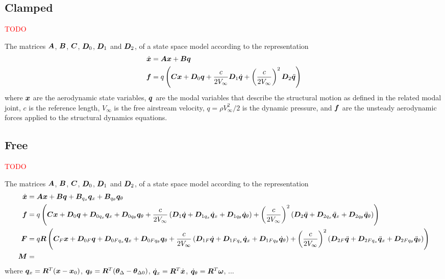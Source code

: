\subsection{Clamped}
\textcolor{red}{TODO}

The matrices $\bm{A}$, $\bm{B}$, $\bm{C}$, $\bm{D}_0$, $\bm{D}_1$ and $\bm{D}_2$,
of a state space model according to the representation
\begin{align*}
	\dot{\bm{x}}
	&=
	\bm{A}\bm{x} + \bm{B}\bm{q}
	\\
	\bm{f}
	&=
	q\left( \bm{C}\bm{x} + \bm{D}_0 \bm{q} + \frac{c}{2V_{\infty}} \bm{D}_1 \dot{\bm{q}} + \left( \frac{c}{2V_{\infty}} \right)^2 \bm{D}_2 \ddot{\bm{q}} \right)
\end{align*}
where $\bm{x}$ are the aerodynamic state variables,
$\bm{q}$ are the modal variables that describe the structural motion
as defined in the related modal joint,
$c$ is the reference length, $V_\infty$ is the free airstream velocity,
$q = \rho V_{\infty}^2/2$ is the dynamic pressure,
and $\bm{f}$ are the unsteady aerodynamic forces applied to the structural
dynamics equations.



\subsection{Free}
\textcolor{red}{TODO}

The matrices $\bm{A}$, $\bm{B}$, $\bm{C}$, $\bm{D}_0$, $\bm{D}_1$ and $\bm{D}_2$,
of a state space model according to the representation
\begin{align*}
	\dot{\bm{x}}
	&=
	\bm{A}\bm{x} + \bm{B}\bm{q} + \bm{B}_{q_x} \bm{q}_x + \bm{B}_{q_\theta} \bm{q}_\theta
	\\
	\bm{f}
	&=
	q\left( 
		\bm{C}\bm{x}
		+
		\bm{D}_0 \bm{q} + \bm{D}_{0 q_x} \bm{q}_x + \bm{D}_{0 q_\theta} \bm{q}_\theta
		+
		\frac{c}{2V_{\infty}} \left( \bm{D}_1 \dot{\bm{q}} + \bm{D}_{1 q_x} \dot{\bm{q}}_x + \bm{D}_{1 q_\theta} \dot{\bm{q}}_\theta \right)
		+
		\left( \frac{c}{2V_{\infty}} \right)^2 \left( \bm{D}_2 \ddot{\bm{q}} + \bm{D}_{2 q_x} \ddot{\bm{q}}_x + \bm{D}_{2 q_\theta} \ddot{\bm{q}}_\theta \right)
	 \right)
	\\
	\bm{F}
	&=
	q \bm{R} \left( 
		\bm{C}_F \bm{x}
		+
		\bm{D}_{0 F} \bm{q} + \bm{D}_{0 F q_x} \bm{q}_x + \bm{D}_{0 F q_\theta} \bm{q}_\theta
		+
		\frac{c}{2V_{\infty}} \left( \bm{D}_{1 F} \dot{\bm{q}} + \bm{D}_{1 F q_x} \dot{\bm{q}}_x + \bm{D}_{1 F q_\theta} \dot{\bm{q}}_\theta \right)
		+
		\left( \frac{c}{2V_{\infty}} \right)^2 \left( \bm{D}_{2 F} \ddot{\bm{q}} + \bm{D}_{2 F q_x} \ddot{\bm{q}}_x + \bm{D}_{2 F q_\theta} \ddot{\bm{q}}_\theta \right)
	 \right)
	\\
	\bm{M}
	&=
\end{align*}
where $\bm{q}_x = \bm{R}^T (\bm{x} - \bm{x}_0)$,
$\bm{q}_\theta = \bm{R}^T (\bm{\theta}_\Delta - \bm{\theta}_{\Delta 0})$,
$\dot{\bm{q}}_x = \bm{R}^T \dot{\bm{x}}$,
$\dot{\bm{q}}_\theta = \bm{R}^T \bm{\omega}$, ...

